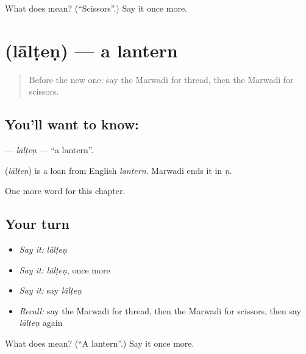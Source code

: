 \begin{tcolorbox}[breakable,colback=teal!4,colframe=teal!35!black,title={Before you move on}]
What does  mean? (\textquotedblleft{}Scissors\textquotedblright{}.) Say it once more.
\end{tcolorbox}
\section[\texorpdfstring{\mw{लालटेण} (lālṭeṇ)}{लालटेण (lālṭeṇ)}]{ (lālṭeṇ) — a lantern}

\label{lesson:MW-C125-lalten}



\begin{quote}
Before the new one: say the Marwadi for thread, then the Marwadi for scissors.
\end{quote}

\subsection*{You'll want to know: }
\textbf{} — \emph{lālṭeṇ} — \textquotedblleft{}a lantern\textquotedblright{}.

\begin{cousinweb}
\textbf{} (\emph{lālṭeṇ}) is a loan from English \emph{lantern}. Marwadi ends it in \emph{ṇ}.
\end{cousinweb}

\begin{grammarlens}[title={What you've built}]
One more word for this chapter.
\end{grammarlens}

\subsection*{Your turn}
\begin{itemize}
\raggedright
  \item \emph{Say it:} \emph{lālṭeṇ}
  \item \emph{Say it:} \emph{lālṭeṇ}, once more
  \item \emph{Say it:} say \emph{lālṭeṇ}
  \item \emph{Recall:} say the Marwadi for thread, then the Marwadi for scissors, then say \emph{lālṭeṇ} again
\end{itemize}

\begin{tcolorbox}[breakable,colback=teal!4,colframe=teal!35!black,title={Before you move on}]
What does  mean? (\textquotedblleft{}A lantern\textquotedblright{}.) Say it once more.
\end{tcolorbox}
